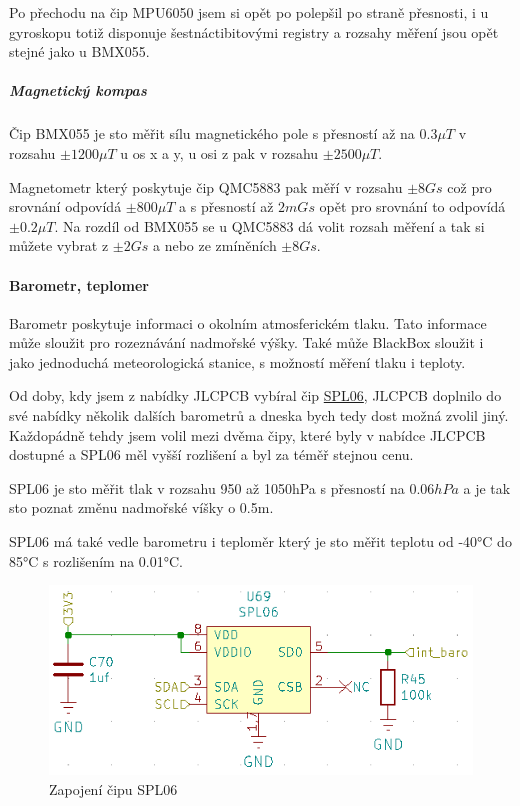 Po přechodu na čip MPU6050 jsem si opět po polepšil po straně přesnosti, i u gyroskopu totiž disponuje šestnáctibitovými registry a rozsahy měření jsou opět stejné jako u BMX055.

\subparagraph*{Magnetický kompas}
Čip BMX055 je sto měřit sílu magnetického pole s přesností až na  $0.3\mu T$ v rozsahu $\pm1200\mu T$ u os x a y, u osi z pak v rozsahu $\pm2500\mu T$.

Magnetometr který poskytuje čip QMC5883 pak měří v rozsahu $\pm8Gs$ což pro srovnání odpovídá $\pm800\mu T$ a s přesností až $2mGs$ opět pro srovnání to odpovídá $\pm0.2\mu T$.
Na rozdíl od BMX055 se u QMC5883 dá volit rozsah měření a tak si můžete vybrat z $\pm2Gs$ a nebo ze zmíněních $\pm8Gs$.

\newpage

\paragraph{Barometr, teplomer}
Barometr poskytuje informaci o okolním atmosferickém tlaku. 
Tato informace může sloužit pro rozeznávání nadmořské výšky. 
Také může BlackBox sloužit i jako jednoduchá meteorologická stanice, s možností měření tlaku i teploty.

Od doby, kdy jsem z nabídky JLCPCB vybíral čip \href{https://datasheet.lcsc.com/szlcsc/1907081118_Goertek-SPL06-007_C233787.pdf}{SPL06}, 
JLCPCB doplnilo do své nabídky několik dalších barometrů a dneska bych tedy dost možná zvolil jiný. Každopádně tehdy jsem volil 
mezi dvěma čipy, které byly v nabídce JLCPCB dostupné a SPL06 měl vyšší rozlišení a byl za téměř stejnou cenu.

SPL06 je sto měřit tlak v rozsahu 950 až 1050hPa s přesností na $0.06 hPa$ a je tak sto poznat změnu nadmořské víšky o 0.5m.

SPL06 má také vedle barometru i teploměr který je sto měřit teplotu od -40°C do 85°C s rozlišením na 0.01°C.

\begin{figure}[h]
    \centering
    \includegraphics[width=\textwidth]{kapitoly/obrazky/E4/vnimani/SPL06.png}
    \caption{Zapojení čipu SPL06}
    \label{fig:E4-SPL06}
\end{figure}

